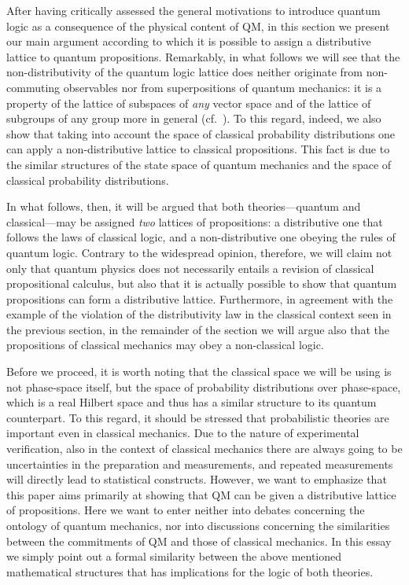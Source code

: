 \documentclass[11pt, executivepaper]{article}
\begin{document}
After having critically assessed the general motivations to introduce quantum logic as a consequence of the physical content of QM, in this section we present our main argument according to which it is possible to assign a distributive lattice to quantum propositions. Remarkably, in what follows we will see that the non-distributivity of the quantum logic lattice does neither originate from non-commuting observables nor from superpositions of quantum mechanics: it is a property of the lattice of subspaces of \emph{any} vector space and of the lattice of subgroups of any group more in general (cf.\ \cite{Davey:2002}). To this regard, indeed, we also show that taking into account the space of classical probability distributions one can apply a non-distributive lattice to classical propositions. This fact is due to the similar structures of the state space of quantum mechanics and the space of classical probability distributions. 

In what follows, then, it will be argued that both theories---quantum and classical---may be assigned \emph{two} lattices of propositions: a distributive one that follows the laws of classical logic, and a non-distributive one obeying the rules of quantum logic. Contrary to the widespread opinion, therefore, we will claim not only that quantum physics does not necessarily entails a revision of classical propositional calculus, but also that it is actually possible to show that quantum propositions can form a distributive lattice. Furthermore, in agreement with the example of the violation of the distributivity law in the classical context seen in the previous section, in the remainder of the section we will argue also that the propositions of classical mechanics may obey a non-classical logic. 

Before we proceed, it is worth noting that the classical space we will be using is not phase-space itself, but the space of probability distributions over phase-space, which is a real Hilbert space and thus has a similar structure to its quantum counterpart. To this regard, it should be stressed that probabilistic theories are important even in classical mechanics. Due to the nature of experimental verification, also in the context of classical mechanics there are always going to be uncertainties in the preparation and measurements, and repeated measurements will directly lead to statistical constructs.
However, we want to emphasize that this paper aims primarily at showing that QM can be given a distributive lattice of propositions. Here we want to enter neither into debates concerning the ontology of quantum mechanics, nor into discussions concerning the similarities between the commitments of QM and those of classical mechanics.  In this essay we simply point out a formal similarity between the above mentioned mathematical structures that has implications for the logic of both theories. 
\end{document}
